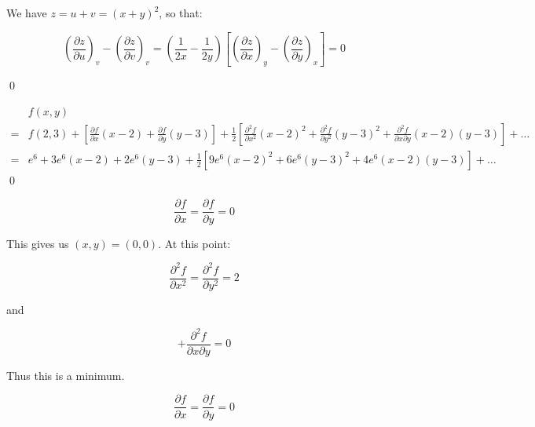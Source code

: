 \documentclass[12pt]{article}
\begin{document}
We have $z = u + v = (x + y)^{2}$, so that:

\begin{equation}
    \left( \frac{\partial z}{\partial u} \right)_{v} - \left( \frac{\partial z}{\partial v} \right)_{v} = \left( \frac{1}{2x} - \frac{1}{2y} \right) \left[ \left( \frac{\partial z}{\partial x} \right)_{y} - \left( \frac{\partial z}{\partial y} \right)_{x} \right] = 0
\end{equation}


\qed



\begin{equation}
    \begin{split}
        &f(x, y) \\
        =& f(2, 3) + \left[ \frac{\partial f}{\partial x} (x - 2) + \frac{\partial f}{\partial y} (y -3) \right] + \frac{1}{2} \left[ \frac{\partial^{2} f}{\partial x^{2}} (x - 2)^{2} + \frac{\partial^{2} f}{\partial y^{2}} (y - 3)^{2} + \frac{\partial^{2} f}{\partial x \partial y} (x - 2) (y - 3) \right] + \dots \\
        =& e^{6} + 3e^{6}(x - 2) + 2e^{6}(y - 3) + \frac{1}{2} \left[ 9e^{6} (x - 2)^{2} + 6e^{6} (y - 3)^{2} + 4e^{6} (x - 2) (y - 3) \right] + \dots
    \end{split}
\end{equation}
\qed




\begin{equation}
    \frac{\partial f}{\partial x} = \frac{\partial f}{\partial y} = 0
\end{equation}

This gives us $(x, y) = (0, 0)$. At this point:

\begin{equation}
    \frac{\partial^{2} f}{\partial x^{2}} = \frac{\partial^{2} f}{\partial y^{2}} = 2
\end{equation}

and

\begin{equation}
    +\frac{\partial^{2} f}{\partial x \partial y} = 0
\end{equation}

Thus this is a minimum.


\begin{equation}
    \frac{\partial f}{\partial x} = \frac{\partial f}{\partial y} = 0
\end{equation}
\end{document}
